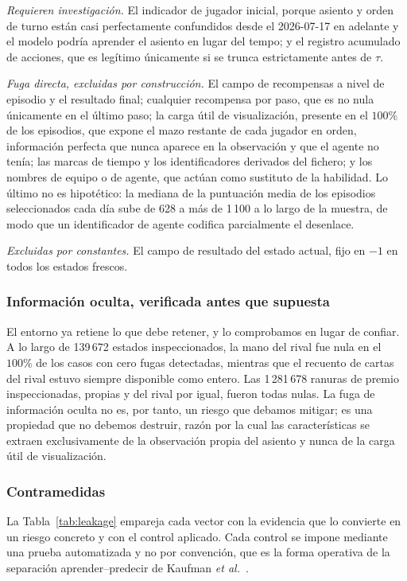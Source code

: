 \documentclass[conference]{IEEEtran}
\begin{document}
\emph{Requieren investigaci\'on.} El indicador de jugador inicial, porque
asiento y orden de turno est\'an casi perfectamente confundidos desde el
2026-07-17 en adelante y el modelo podr\'ia aprender el asiento en lugar del
tempo; y el registro acumulado de acciones, que es leg\'itimo \'unicamente si
se trunca estrictamente antes de $\tau$.

\emph{Fuga directa, excluidas por construcci\'on.} El campo de recompensas a
nivel de episodio y el resultado final; cualquier recompensa por paso, que es
no nula \'unicamente en el \'ultimo paso; la carga \'util de visualizaci\'on,
presente en el $100\%$ de los episodios, que expone el mazo restante de
cada jugador en orden, informaci\'on perfecta que nunca aparece en la
observaci\'on y que el agente no ten\'ia; las marcas de tiempo y los
identificadores derivados del fichero; y los nombres de equipo o de agente,
que act\'uan como sustituto de la habilidad. Lo \'ultimo no es hipot\'etico:
la mediana de la puntuaci\'on media de los episodios seleccionados cada
d\'ia sube de 628 a m\'as de 1\,100 a lo largo de la muestra, de modo que un
identificador de agente codifica parcialmente el desenlace.

\emph{Excluidas por constantes.} El campo de resultado del estado actual,
fijo en $-1$ en todos los estados frescos.

\subsubsection{Informaci\'on oculta, verificada antes que supuesta}
El entorno ya retiene lo que debe retener, y lo comprobamos en lugar de
confiar. A lo largo de 139\,672 estados inspeccionados, la mano del rival fue
nula en el $100\%$ de los casos con cero fugas detectadas, mientras que el
recuento de cartas del rival estuvo siempre disponible como entero. Las
1\,281\,678 ranuras de premio inspeccionadas, propias y del rival por
igual, fueron todas nulas. La fuga de informaci\'on oculta no es, por
tanto, un riesgo que debamos mitigar; es una propiedad que no debemos
destruir, raz\'on por la cual las caracter\'isticas se extraen exclusivamente
de la observaci\'on propia del asiento y nunca de la carga \'util de
visualizaci\'on.

\subsubsection{Contramedidas}
La Tabla~\ref{tab:leakage} empareja cada vector con la evidencia que lo
convierte en un riesgo concreto y con el control aplicado. Cada control se
impone mediante una prueba automatizada y no por convenci\'on, que es la
forma operativa de la separaci\'on aprender--predecir de Kaufman \textit{et
al.}~\cite{kaufman_leakage_2011}.
\end{document}
